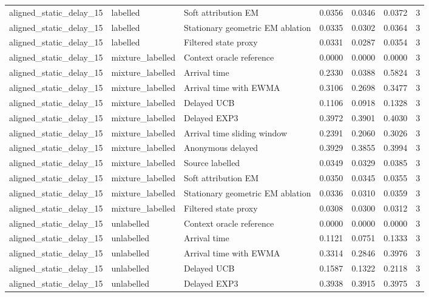 \begin{tabular}{llllllr}
aligned\_static\_delay\_15 & labelled & Soft attribution EM & 0.0356 & 0.0346 & 0.0372 & 3 \\
aligned\_static\_delay\_15 & labelled & Stationary geometric EM ablation & 0.0335 & 0.0302 & 0.0364 & 3 \\
aligned\_static\_delay\_15 & labelled & Filtered state proxy & 0.0331 & 0.0287 & 0.0354 & 3 \\
aligned\_static\_delay\_15 & mixture\_labelled & Context oracle reference & 0.0000 & 0.0000 & 0.0000 & 3 \\
aligned\_static\_delay\_15 & mixture\_labelled & Arrival time & 0.2330 & 0.0388 & 0.5824 & 3 \\
aligned\_static\_delay\_15 & mixture\_labelled & Arrival time with EWMA & 0.3106 & 0.2698 & 0.3477 & 3 \\
aligned\_static\_delay\_15 & mixture\_labelled & Delayed UCB & 0.1106 & 0.0918 & 0.1328 & 3 \\
aligned\_static\_delay\_15 & mixture\_labelled & Delayed EXP3 & 0.3972 & 0.3901 & 0.4030 & 3 \\
aligned\_static\_delay\_15 & mixture\_labelled & Arrival time sliding window & 0.2391 & 0.2060 & 0.3026 & 3 \\
aligned\_static\_delay\_15 & mixture\_labelled & Anonymous delayed & 0.3929 & 0.3855 & 0.3994 & 3 \\
aligned\_static\_delay\_15 & mixture\_labelled & Source labelled & 0.0349 & 0.0329 & 0.0385 & 3 \\
aligned\_static\_delay\_15 & mixture\_labelled & Soft attribution EM & 0.0350 & 0.0345 & 0.0355 & 3 \\
aligned\_static\_delay\_15 & mixture\_labelled & Stationary geometric EM ablation & 0.0336 & 0.0310 & 0.0359 & 3 \\
aligned\_static\_delay\_15 & mixture\_labelled & Filtered state proxy & 0.0308 & 0.0300 & 0.0312 & 3 \\
aligned\_static\_delay\_15 & unlabelled & Context oracle reference & 0.0000 & 0.0000 & 0.0000 & 3 \\
aligned\_static\_delay\_15 & unlabelled & Arrival time & 0.1121 & 0.0751 & 0.1333 & 3 \\
aligned\_static\_delay\_15 & unlabelled & Arrival time with EWMA & 0.3314 & 0.2846 & 0.3976 & 3 \\
aligned\_static\_delay\_15 & unlabelled & Delayed UCB & 0.1587 & 0.1322 & 0.2118 & 3 \\
aligned\_static\_delay\_15 & unlabelled & Delayed EXP3 & 0.3938 & 0.3915 & 0.3975 & 3 \\

\end{tabular}

